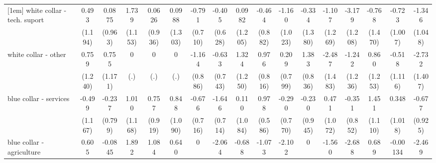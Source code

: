 {\begin{tabular}{l*{16}{c}}
[1em]
white collar - tech. suport&       0.493         &      0.0875         &       1.739         &      0.0626         &      0.0988         &      -0.791         &      -0.405         &      0.0982         &      -0.464         &      -1.160         &      -0.334         &      -1.107         &      -3.179\sym{**} &      -0.768         &      -0.723         &      -1.346         \\
                    &     (1.194)         &     (0.963)         &     (1.153)         &     (0.936)         &     (1.303)         &     (0.710)         &     (0.628)         &     (1.205)         &     (0.882)         &     (1.023)         &     (1.380)         &     (1.269)         &     (1.208)         &     (1.470)         &     (1.007)         &     (1.048)         \\
[1em]
white collar - other&       0.759         &       0.755         &           0         &           0         &           0         &      -1.164         &      -0.633         &       1.324         &       0.976         &       0.209         &       1.383         &      -2.487         &      -1.242         &       0.860         &      -0.518         &      -2.732         \\
                    &     (1.240)         &     (1.171)         &         (.)         &         (.)         &         (.)         &     (0.886)         &     (0.743)         &     (1.250)         &     (0.816)         &     (0.799)         &     (0.836)         &     (1.483)         &     (1.236)         &     (1.253)         &     (1.116)         &     (1.407)         \\
[1em]
blue collar - services&      -0.499         &      -0.237         &       1.010         &       0.757         &       0.848         &      -0.676         &      -1.646\sym{*}  &       0.110         &       0.978         &      -0.290         &      -0.230         &       0.471         &      -0.351         &       1.451         &       0.348         &      -0.677         \\
                    &     (1.167)         &     (0.799)         &     (1.168)         &     (0.919)         &     (1.090)         &     (0.716)         &     (0.714)         &     (1.084)         &     (0.586)         &     (0.770)         &     (0.945)         &     (1.072)         &     (0.852)         &     (1.110)         &     (1.018)         &     (0.925)         \\
[1em]
blue collar - agriculture&       0.605         &     -0.0845         &       1.892         &       1.084         &       0.640         &           0         &      -2.064         &      -0.688         &      -1.073         &      -2.102         &           0         &      -1.560         &      -2.688\sym{*}  &       0.689         &    -0.00134         &      -2.469         \\

\end{tabular}}
